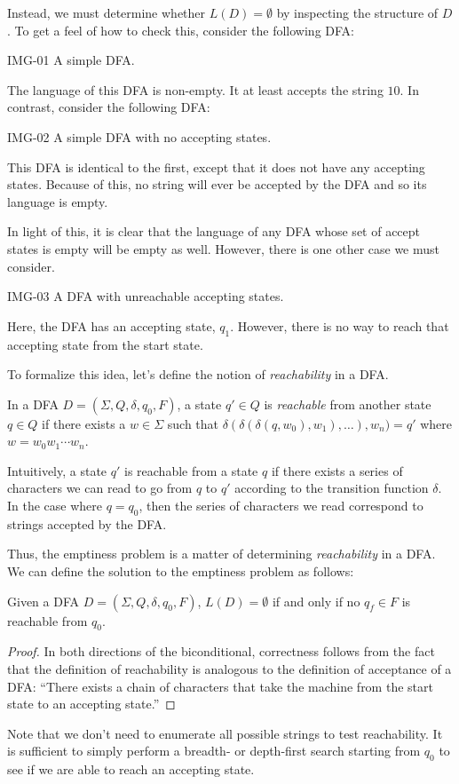 \documentclass[11pt]{book}
\begin{document}
Instead, we must determine whether $L(D) = \emptyset$ by inspecting the structure of $D$.
To get a feel of how to check this, consider the following DFA:

IMG-01 A simple DFA.

The language of this DFA is non-empty.
It at least accepts the string $10$.
In contrast, consider the following DFA:

IMG-02 A simple DFA with no accepting states.

This DFA is identical to the first, except that it does not have any accepting states.
Because of this, no string will ever be accepted by the DFA and so its language is empty.

In light of this, it is clear that the language of any DFA whose set of accept states is empty will be empty as well.
However, there is one other case we must consider.

IMG-03 A DFA with unreachable accepting states.

Here, the DFA has an accepting state, $q_1$.
However, there is no way to reach that accepting state from the start state.

To formalize this idea, let's define the notion of \emph{reachability} in a DFA.
\begin{defn}
  In a DFA $D = (\Sigma, Q, \delta, q_0, F)$, a state $q' \in Q$ is \emph{reachable} from another state $q \in Q$ if there exists a $w \in \Sigma$ such that $\delta(\delta(\delta(q, w_0), w_1), \ldots), w_n) = q'$ where $w = w_0 w_1 \cdots w_n$.
\end{defn}
Intuitively, a state $q'$ is reachable from a state $q$ if there exists a series of characters we can read to go from $q$ to $q'$ according to the transition function $\delta$.
In the case where $q = q_0$, then the series of characters we read correspond to strings accepted by the DFA.

Thus, the emptiness problem is a matter of determining \emph{reachability} in a DFA.
We can define the solution to the emptiness problem as follows:
\begin{thm}
  Given a DFA $D = (\Sigma, Q, \delta, q_0, F)$, $L(D) = \emptyset$ if and only if no $q_f \in F$ is reachable from $q_0$.
\end{thm}
\begin{proof}
  In both directions of the biconditional, correctness follows from the fact that the definition of reachability is analogous to the definition of acceptance of a DFA: ``There exists a chain of characters that take the machine from the start state to an accepting state.''
\end{proof}
Note that we don't need to enumerate all possible strings to test reachability.
It is sufficient to simply perform a breadth- or depth-first search starting from $q_0$ to see if we are able to reach an accepting state.
\end{document}
